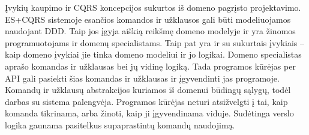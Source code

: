 Įvykių kaupimo ir CQRS koncepcijos sukurtos iš domeno pagrįsto projektavimo. ES+CQRS sistemoje esančios komandos ir užklausos gali būti modeliuojamos naudojant DDD. Taip jos įgyja aiškią reikšmę domeno modelyje ir yra žinomos programuotojams ir domenų specialistams. Taip pat yra ir su sukurtais įvykiais – kaip domeno įvykiai jie tinka domeno modeliui ir jo logikai. Domeno specialistas aprašo komandas ir užklausas bei jų vidinę logiką. Tada programos kūrėjas per API gali pasiekti šias komandas ir užklausas ir įgyvendinti jas programoje. Komandų ir užklausų abstrakcijos kuriamos iš domenui būdingų sąlygų, todėl darbas su sistema palengvėja. Programos kūrėjas neturi atsižvelgti į tai, kaip komanda tikrinama, arba žinoti, kaip ji įgyvendinama viduje. Sudėtinga verslo logika gaunama pasitelkus supaprastintų komandų naudojimą.
